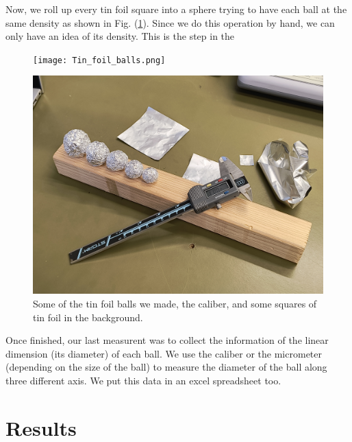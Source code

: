 \documentclass[a4paper,12pt]{article}
\begin{document}
Now, we roll up every tin foil square into a sphere trying to have each ball at the same density as shown in Fig. (\ref{fig:tf_balls}). 
Since we do this operation by hand, we can only have an idea of its density. This is the step in the 

\begin{figure}[h!]
    \centering
    \begin{minipage}{0.45\textwidth}
        \centering
        \texttt{[image: Tin\_foil\_balls.png]}
    \end{minipage}%
    \hspace{0.05\textwidth} %
    \begin{minipage}{0.45\textwidth}
        \centering
        \includegraphics[width=\textwidth]{Tin_foil_balls.jpg}
    \end{minipage}
    
    \caption{Some of the tin foil balls we made, the caliber, and some squares of tin foil in the background.}
    \label{fig:tf_balls}
\end{figure}

Once finished, our last measurent was to collect the information of the linear dimension (its diameter) 
of each ball. We use the caliber or the micrometer (depending on the size of the ball) to measure the diameter 
of the ball along three different axis. We put this data in an excel spreadsheet too.

\section{Results}\label{sec:results}
\end{document}
